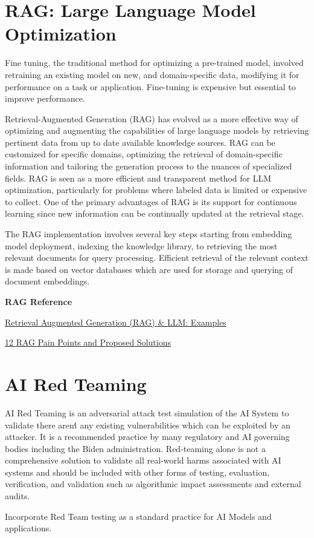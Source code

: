 \section{RAG: Large Language Model Optimization}
Fine tuning, the traditional method for optimizing a pre-trained model,
involved retraining an existing model on new, and domain-specific data,
modifying it for performance on a task or application. Fine-tuning is expensive
but essential to improve performance.

Retrieval-Augmented Generation (RAG) has evolved as a more effective way of
optimizing and augmenting the capabilities of large language models by
retrieving pertinent data from up to date available knowledge sources. RAG can
be customized for specific domains, optimizing the retrieval of domain-specific
information and tailoring the generation process to the nuances of specialized
fields. RAG is seen as a more efficient and transparent method for LLM
optimization, particularly for problems where labeled data is limited or
expensive to collect. One of the primary advantages of RAG is its support for
continuous learning since new information can be continually updated at the
retrieval stage.

The RAG implementation involves several key steps starting from embedding model
deployment, indexing the knowledge library, to retrieving the most relevant
documents for query processing. Efficient retrieval of the relevant context is
made based on vector databases which are used for storage and querying of
document embeddings.

\textbf{RAG Reference}

\begin{minipage}{\linewidth}
\begin{checklist}
  \item \href{https://vitalflux.com/retrieval-augmented-generation-rag-llm-examples/}{Retrieval Augmented Generation (RAG) \& LLM: Examples}
  \item \href{https://towardsdatascience.com/12-rag-pain-points-and-proposed-solutions-43709939a28c}{12 RAG Pain Points and Proposed Solutions}
\end{checklist}
\end{minipage}

\section{AI Red Teaming}
AI Red Teaming is an adversarial attack test simulation of the AI System to
validate there aren\'t any existing vulnerabilities which can be exploited by
an attacker. It is a recommended practice by many regulatory and AI governing
bodies including the Biden administration. Red-teaming alone is not a
comprehensive solution to validate all real-world harms associated with AI
systems and should be included with other forms of testing, evaluation,
verification, and validation such as algorithmic impact assessments and
external audits.

\begin{minipage}{\linewidth}
\begin{checklist}
  \item Incorporate Red Team testing as a standard practice for AI Models and
  applications.
\end{checklist}
\end{minipage}